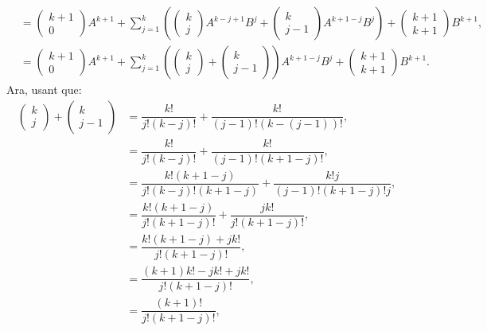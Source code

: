 \begin{exercise}[1.8.9]
\begin{solution}
\begin{align}
    &= \begin{pmatrix} k+1 \\0 \end{pmatrix}A^{k+1}+ \sum_{j=1}^k \left(\begin{pmatrix} k \\j \end{pmatrix} A^{k-j+1}B^j+\begin{pmatrix} k \\j-1 \end{pmatrix} A^{k+1-j}B^{j}\right)+\begin{pmatrix} k+1 \\k+1 \end{pmatrix}B^{k+1} ,\\
    \label{ex189_a}&= \begin{pmatrix} k+1 \\0 \end{pmatrix}A^{k+1}+ \sum_{j=1}^k \left(\begin{pmatrix} k \\j \end{pmatrix} +\begin{pmatrix} k \\j-1 \end{pmatrix}\right) A^{k+1-j}B^{j}+\begin{pmatrix} k+1 \\k+1 \end{pmatrix}B^{k+1}.
\end{align}
Ara, usant que:
    \begin{align}
    \begin{pmatrix} k \\j \end{pmatrix} +\begin{pmatrix} k \\j-1 \end{pmatrix} 
        &= \dfrac{k!}{j!(k-j)!} + \dfrac{k!}{(j-1)!(k-(j-1))!},\\
        &= \dfrac{k!}{j!(k-j)!} + \dfrac{k!}{(j-1)!(k+1-j)!},\\
        &= \dfrac{k!(k+1-j)}{j!(k-j)!(k+1-j)} + \dfrac{k!j}{(j-1)!(k+1-j)!j},\\
        &= \dfrac{k!(k+1-j)}{j!(k+1-j)!} + \dfrac{j k!}{j!(k+1-j)!},\\
        &= \dfrac{k! (k+1-j)+jk!}{j!(k+1-j)!},\\
        &= \dfrac{(k+1)k! -jk!+jk!}{j!(k+1-j)!},\\
        &= \dfrac{(k+1)!}{j!(k+1-j)!},\\

\end{align}
\end{solution}
\end{exercise}

